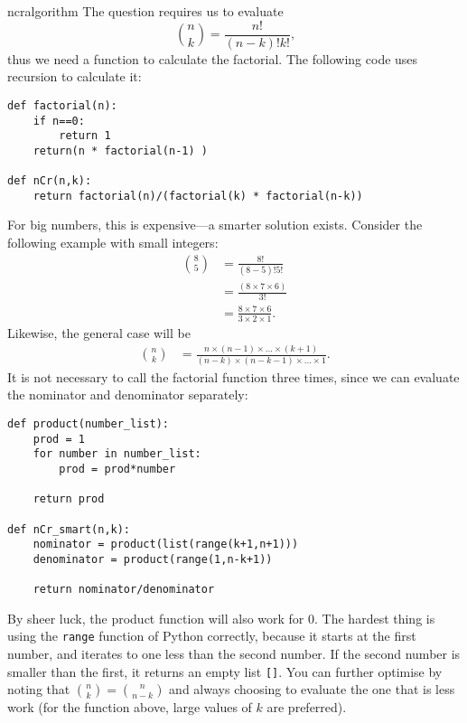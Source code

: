 \begin{answer}{ncralgorithm}
The question requires us to evaluate
\[
\binom{n}{k} = \frac{n!}{ (n-k)! k! }
\text{,}
\]
thus we need a function to calculate the factorial.
The following code uses recursion to calculate it:
\begin{verbatim}
def factorial(n):
    if n==0:
        return 1
    return(n * factorial(n-1) )

def nCr(n,k):
    return factorial(n)/(factorial(k) * factorial(n-k))
\end{verbatim}
For big numbers, this is expensive---a smarter solution exists.
Consider the following example with small integers:
\begin{align*}
\binom{8}{5} &= \frac{8!}{ (8-5)! 5! } \\
             &= \frac{(8 \times 7 \times 6 )}{3!} \\
             &= \frac{8 \times 7 \times 6 }{  3 \times 2 \times 1 }
\text{.}
\end{align*}
Likewise, the general case will be
\begin{align*}
\binom{n}{k}
             &= \frac{n \times (n-1) \times  \ldots \times (k+1) }{ (n-k) \times (n-k-1) \times \ldots \times 1 }
\text{.}
\end{align*}
It is not necessary to call the factorial function three times, since
we can evaluate the nominator and denominator separately:
\begin{verbatim}
def product(number_list):
    prod = 1
    for number in number_list:
        prod = prod*number

    return prod

def nCr_smart(n,k):
    nominator = product(list(range(k+1,n+1)))
    denominator = product(range(1,n-k+1))

    return nominator/denominator
\end{verbatim}
By sheer luck, the product function will also work for $0$.
The hardest thing is using the \verb+range+ function of Python correctly, because it starts at the first number, and iterates to one less than the second number.
If the second number is smaller than the first, it returns an empty list \verb+[]+.
You can further optimise by noting that $\binom{n}{k}=\binom{n}{n-k}$ and always choosing to evaluate the one that is less work (for the function above, large values of $k$ are preferred).
\end{answer}
